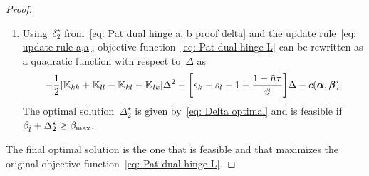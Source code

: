 \begin{proof}
\begin{enumerate}
    \item Using~$\delta^{\star}_2$ from~\eqref{eq: Pat dual hinge a, b proof delta} and the update rule~\eqref{eq: update rule a,a}, objective function~\eqref{eq: Pat dual hinge L} can be rewritten as a quadratic function with respect to~$\Delta$ as
    \begin{equation*}
      - \frac{1}{2} \Brac[s]{\K_{kk} + \K_{ll} - \K_{kl} - \K_{lk}} \Delta^2
      - \Brac[s]{s_k - s_l - 1 - \frac{1 - \ntil \tau}{\vartheta}} \Delta
      - c(\bm{\alpha}, \bm{\beta}).
    \end{equation*}
    The optimal solution~$\Delta^{\star}_2$ is given by~\eqref{eq: Delta optimal} and is feasible if~$\beta_{\hat{l}} + \Delta^{\star}_2 \geq \beta_{\max}$.
  \end{enumerate}
  The final optimal solution is the one that is feasible and that maximizes the original objective function~\eqref{eq: Pat dual hinge L}.
\end{proof}

